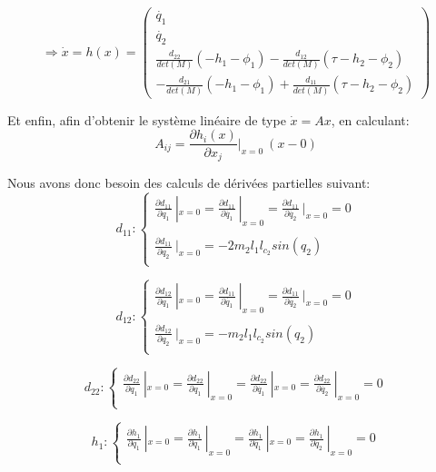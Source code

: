 \documentclass[a4paper,12pt]{report}
\begin{document}
$$
    \Rightarrow
    \dot{x}
    =
    h(x)
    =
    \begin{pmatrix}
    \dot{q_1} \\
    \dot{q_2} \\
    \frac{d_{22}}{det(M)}(-h_1 - \phi_1) - \frac{d_{12}}{det(M)}(\tau -h_2 - \phi_2) \\
    -\frac{d_{21}}{det(M)}(-h_1 - \phi_1) + \frac{d_{11}}{det(M)} (\tau -h_2 - \phi_2)     
    \end{pmatrix}
$$


Et enfin, afin d'obtenir le système linéaire de type $\dot{x}=Ax$, en calculant:
$$A_{ij} = \frac{\partial h_i(x)}{\partial{x_j}}|_{x=0} \ (x-0)$$

Nous avons donc besoin des calculs de dérivées partielles suivant:
$$
d_{11} : \left\{
    \begin{array}{ll}
	\frac{\partial d_{11}}{\partial q_1}\ |_{x=0} = \frac{\partial d_{11}}{\partial \dot{q_1}}\ |_{x=0} = \frac{\partial d_{11}}{\partial \dot{q_2}}\ |_{x=0} = 0 \\
	\ \\
	\frac{\partial d_{11}}{\partial q_2}\ |_{x=0} = -2m_2l_1l_{c_2}sin(q_2)\\
    \end{array}
\right.
$$

$$
d_{12} : \left\{
    \begin{array}{ll}
	\frac{\partial d_{12}}{\partial q_1}\ |_{x=0} = \frac{\partial d_{11}}{\partial \dot{q_1}}\ |_{x=0} = \frac{\partial d_{11}}{\partial \dot{q_2}}\ |_{x=0} = 0 \\
	\ \\
	\frac{\partial d_{12}}{\partial q_2}\ |_{x=0} = -m_2l_1l_{c_2}sin(q_2)\\
    \end{array}
\right.
$$

$$
d_{22} : \left\{
    \begin{array}{ll}
	\frac{\partial d_{22}}{\partial q_1}\ |_{x=0} = \frac{\partial d_{22}}{\partial q_1}\ |_{x=0} = \frac{\partial d_{22}}{\partial \dot{q_1}}\ |_{x=0} = \frac{\partial d_{22}}{\partial \dot{q_2}}\ |_{x=0} = 0 \\
    \end{array}
\right.
$$

$$
h_1 : \left\{
    \begin{array}{ll}
	\frac{\partial h_1}{\partial q_1}\ |_{x=0} = \frac{\partial h_1}{\partial q_1}\ |_{x=0} = \frac{\partial h_1}{\partial \dot{q_1}}\ |_{x=0} = \frac{\partial h_1}{\partial \dot{q_2}}\ |_{x=0} = 0 \\
    \end{array}
\right.
$$
\end{document}

